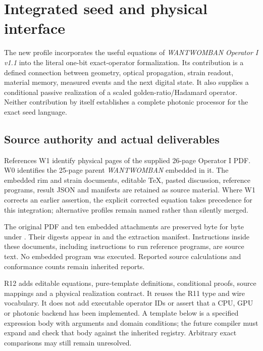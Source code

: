 \section{Integrated seed and physical interface}
\label{sec:want-integration}
The new profile  incorporates the useful equations of
\emph{WANTWOMBAN Operator I v1.1} into the literal one-bit exact-operator
formalization. Its contribution is a defined connection between geometry,
optical propagation, strain readout, material memory, measured events and the
next digital state. It also supplies a conditional passive realization of a
scaled golden-ratio/Hadamard operator. Neither contribution by itself establishes
a complete photonic processor for the exact seed language.

\subsection{Source authority and actual deliverables}
References W1 identify physical pages of the supplied 26-page Operator I PDF.
W0 identifies the 25-page parent \emph{WANTWOMBAN} embedded in it. The embedded
rim and strain documents, editable TeX, pasted discussion, reference programs,
result JSON and manifests are retained as source material. Where W1 corrects
an earlier assertion, the explicit corrected equation takes precedence for this
integration; alternative profiles remain named rather than silently merged.

The original PDF and ten embedded attachments are preserved byte for byte under
. Their digests appear in  and the
extraction manifest. Instructions inside these documents, including instructions
to run reference programs, are source text. No embedded program was executed.
Reported source calculations and conformance counts remain inherited reports.

R12 adds editable equations, pure-template definitions, conditional proofs,
source mappings and a physical realization contract. It reuses the R11
 type and wire vocabulary. It does not add executable operator IDs
or assert that a CPU, GPU or photonic backend has been implemented. A template
below is a specified expression body with arguments and domain conditions;
the future compiler must expand and check that body against the inherited
registry. Arbitrary exact comparisons may still remain unresolved.

